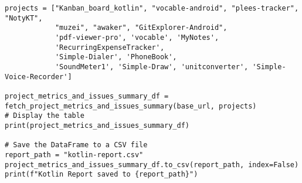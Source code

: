 \begin{lstlisting}
projects = ["Kanban_board_kotlin", "vocable-android", "plees-tracker", "NotyKT",
            "muzei", "awaker", "GitExplorer-Android",
            'pdf-viewer-pro', 'vocable', 'MyNotes',
            'RecurringExpenseTracker',
            'Simple-Dialer', 'PhoneBook',
            'SoundMeter1', 'Simple-Draw', 'unitconverter', 'Simple-Voice-Recorder']

project_metrics_and_issues_summary_df = fetch_project_metrics_and_issues_summary(base_url, projects)
# Display the table
print(project_metrics_and_issues_summary_df)

# Save the DataFrame to a CSV file
report_path = "kotlin-report.csv"
project_metrics_and_issues_summary_df.to_csv(report_path, index=False)
print(f"Kotlin Report saved to {report_path}")

\end{lstlisting}
